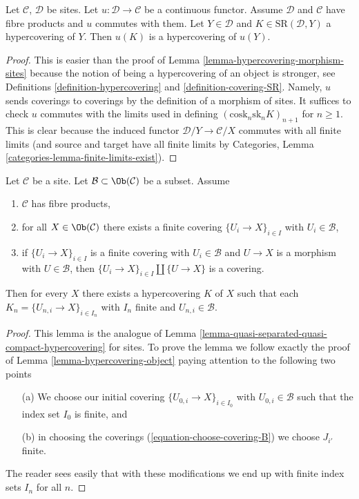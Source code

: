\begin{lemma}
\label{lemma-hypercovering-continuous-functor}
Let $\mathcal{C}$, $\mathcal{D}$ be sites. Let
$u : \mathcal{D} \to \mathcal{C}$ be a continuous functor.
Assume $\mathcal{D}$ and $\mathcal{C}$ have fibre products
and $u$ commutes with them. Let $Y \in \mathcal{D}$ and
$K \in \text{SR}(\mathcal{D}, Y)$ a hypercovering of $Y$.
Then $u(K)$ is a hypercovering of $u(Y)$.
\end{lemma}

\begin{proof}
This is easier than the proof of Lemma \ref{lemma-hypercovering-morphism-sites}
because the notion of being a hypercovering of an object is stronger, see
Definitions \ref{definition-hypercovering} and \ref{definition-covering-SR}.
Namely, $u$ sends coverings to coverings by the definition of
a morphism of sites. It suffices to check $u$ commutes with the
limits used in defining
$(\text{cosk}_n \text{sk}_n K)_{n + 1}$ for $n \geq 1$.
This is clear because the induced functor
$\mathcal{D}/Y \to \mathcal{C}/X$ commutes with all finite limits
(and source and target have all finite limits by
Categories, Lemma \ref{categories-lemma-finite-limits-exist}).
\end{proof}

\begin{lemma}
\label{lemma-w-contractible}
Let $\mathcal{C}$ be a site. Let $\mathcal{B} \subset \Ob(\mathcal{C})$
be a subset. Assume
\begin{enumerate}
\item $\mathcal{C}$ has fibre products,
\item for all $X \in \Ob(\mathcal{C})$ there exists a finite covering
$\{U_i \to X\}_{i \in I}$ with $U_i \in \mathcal{B}$,
\item if $\{U_i \to X\}_{i \in I}$ is a finite covering with
$U_i \in \mathcal{B}$ and $U \to X$ is a morphism with $U \in \mathcal{B}$,
then $\{U_i \to X\}_{i \in I} \amalg \{U \to X\}$ is a covering.
\end{enumerate}
Then for every $X$ there exists a hypercovering $K$ of $X$
such that each $K_n = \{U_{n, i} \to X\}_{i \in I_n}$ with
$I_n$ finite and $U_{n, i} \in \mathcal{B}$.
\end{lemma}

\begin{proof}
This lemma is the analogue of
Lemma \ref{lemma-quasi-separated-quasi-compact-hypercovering}
for sites. To prove the lemma we follow exactly the proof of
Lemma \ref{lemma-hypercovering-object}
paying attention to the following two points
\begin{enumerate}
\item[(a)] We choose our initial covering $\{U_{0, i} \to X\}_{i \in I_0}$
with $U_{0, i} \in \mathcal{B}$ such that the index set $I_0$ is finite, and
\item[(b)] in choosing the coverings
(\ref{equation-choose-covering-B})
we choose $J_{i'}$ finite.
\end{enumerate}
The reader sees easily that with these modifications we end up
with finite index sets $I_n$ for all $n$.
\end{proof}

